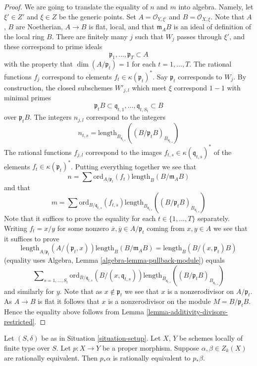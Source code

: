 \begin{proof}
\medskip\noindent
We are going to translate the equality of $n$ and $m$ into algebra.
Namely, let $\xi' \in Z'$ and $\xi \in Z$ be the generic points.
Set $A = \mathcal{O}_{Y, \xi'}$ and $B = \mathcal{O}_{X, \xi}$.
Note that $A$, $B$ are Noetherian, $A \to B$ is flat, local,
and that $\mathfrak m_AB$ is an ideal of definition of the local ring $B$.
There are finitely many $j$ such that $W_j$ passes through
$\xi'$, and these correspond to prime ideals
$$
\mathfrak p_1, \ldots, \mathfrak p_T \subset A
$$
with the property that $\dim(A/\mathfrak p_t) = 1$ for each
$t = 1, \ldots, T$. The rational functions $f_j$ correspond
to elements $f_t \in \kappa(\mathfrak p_t)^*$.
Say $\mathfrak p_t$ corresponds to $W_j$.
By construction, the closed subschemes $W'_{j, l}$ which meet
$\xi$ correspond $1 - 1$ with minimal primes
$$
\mathfrak p_tB
\subset
\mathfrak q_{t, 1}, \ldots, \mathfrak q_{t, S_t}
\subset
B
$$
over $\mathfrak p_tB$.
The integers $n_{j, l}$ correspond to the integers
$$
n_{t, s} = \text{length}_{B_{\mathfrak q_{t, s}}}
((B/\mathfrak p_tB)_{B_{\mathfrak q_{t, s}}})
$$
The rational functions $f_{j, l}$ correspond to the images
$f_{t, s} \in \kappa(\mathfrak q_{t, s})^*$ of the elements
$f_t \in \kappa(\mathfrak p_t)^*$. Putting everything together
we see that
$$
n = \sum \text{ord}_{A/\mathfrak p_t}(f_t)\text{length}_B(B/\mathfrak m_AB)
$$
and that
$$
m = \sum \text{ord}_{B/\mathfrak q_{t, s}}(f_{t, s})
\text{length}_{B_{\mathfrak q_{t, s}}}
((B/\mathfrak p_tB)_{B_{\mathfrak q_{t, s}}})
$$
Note that it suffices to prove the equality for each
$t \in \{1, \ldots, T\}$ separately. Writing $f_t = x/y$
for some nonzero $\overline{x}, \overline{y} \in A/\mathfrak p_t$
coming from $x, y\in A$ we see that it suffices
to prove
$$
\text{length}_{A/\mathfrak p_t}(A/(\mathfrak p_t, x))
\text{length}_B(B/\mathfrak m_AB)
=
\text{length}_B(B/(x, \mathfrak p_t)B)
$$
(equality uses Algebra, Lemma \ref{algebra-lemma-pullback-module})
equals
$$
\sum\nolimits_{s = 1, \ldots, S_t}
\text{ord}_{B/\mathfrak q_{t, s}}(B/(x, \mathfrak q_{t, s}))
\text{length}_{B_{\mathfrak q_{t, s}}}
((B/\mathfrak p_tB)_{B_{\mathfrak q_{t, s}}})
$$
and similarly for $y$. Note that as $x \not \in \mathfrak p_t$ we
see that $x$ is a nonzerodivisor on $A/\mathfrak p_t$. As $A \to B$
is flat it follows that $x$ is a nonzerodivisor on the module
$M = B/\mathfrak p_tB$. Hence the equality above follows from
Lemma \ref{lemma-additivity-divisors-restricted}.
\end{proof}

\begin{lemma}
\label{lemma-proper-pushforward-rational-equivalence}
Let $(S, \delta)$ be as in Situation \ref{situation-setup}.
Let $X$, $Y$ be schemes locally of finite type over $S$.
Let $p : X \to Y$ be a proper morphism.
Suppose $\alpha, \beta \in Z_k(X)$ are rationally equivalent.
Then $p_*\alpha$ is rationally equivalent to $p_*\beta$.
\end{lemma}

